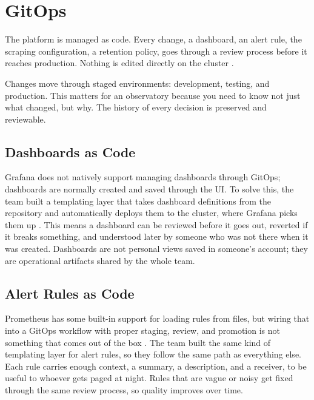 \section{GitOps}

The platform is managed as code. Every change, a dashboard, an alert rule, the scraping
configuration, a retention policy, goes through a review process before it reaches production.
Nothing is edited directly on the cluster \cite{lsst-it-k8s-cookbook}.

Changes move through staged environments: development, testing, and production. This matters for
an observatory because you need to know not just what changed, but why. The history of every
decision is preserved and reviewable.

\subsection{Dashboards as Code}

Grafana does not natively support managing dashboards through GitOps; dashboards are normally
created and saved through the UI. To solve this, the team built a templating layer that takes
dashboard definitions from the repository and automatically deploys them to the cluster, where
Grafana picks them up \cite{lsst-it-k8s-cookbook}. This means a dashboard can be reviewed before
it goes out, reverted if it breaks something, and understood later by someone who was not there
when it was created. Dashboards are not personal views saved in someone's account; they are
operational artifacts shared by the whole team.

\subsection{Alert Rules as Code}

Prometheus has some built-in support for loading rules from files, but wiring that into a GitOps
workflow with proper staging, review, and promotion is not something that comes out of the box
\cite{lsst-it-k8s-cookbook,prometheus-alerting,prometheus-alertmanager}. The team built the same
kind of templating layer for alert rules, so they follow the same path as everything else. Each
rule carries enough context, a summary, a description, and a receiver, to be useful to whoever
gets paged at night. Rules that are vague or noisy get fixed through the same review process, so
quality improves over time.

